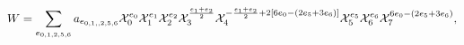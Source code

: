 \begin{equation}
\label{eq:W}
W=\sum_{e_{0,1,2,5,6}}a_{e_{0,1,,2,5,6}}{\cal X}_0^{e_0}{\cal X}_1^{e_1}{\cal X}_2^{e_2}
{\cal X}_3^{{e_1+e_2\over2}}{\cal X}_4^{-{e_1+e_2\over2}+2[6e_0-(2e_5+3e_6)]}
{\cal X}_5^{e_5}{\cal X}_6^{e_6}{\cal X}_7^{6e_0-(2e_5+3e_6)},
\end{equation}

